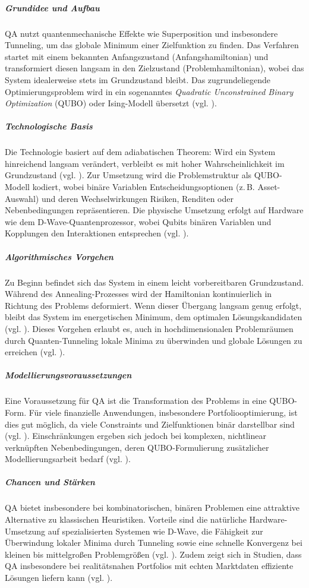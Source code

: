 \subparagraph{Grundidee und Aufbau}
QA nutzt quantenmechanische Effekte wie Superposition und insbesondere Tunneling, um das globale Minimum einer Zielfunktion zu finden. Das Verfahren startet mit einem bekannten Anfangszustand (Anfangshamiltonian) und transformiert diesen langsam in den Zielzustand (Problemhamiltonian), wobei das System idealerweise stets im Grundzustand bleibt. Das zugrundeliegende Optimierungsproblem wird in ein sogenanntes \emph{Quadratic Unconstrained Binary Optimization} (QUBO) oder Ising-Modell übersetzt (vgl. \cite{orus_quantum_2019, mugel_dynamic_2022}).

\subparagraph{Technologische Basis}
Die Technologie basiert auf dem adiabatischen Theorem: Wird ein System hinreichend langsam verändert, verbleibt es mit hoher Wahrscheinlichkeit im Grundzustand (vgl. \cite{orus_quantum_2019}). Zur Umsetzung wird die Problemstruktur als QUBO-Modell kodiert, wobei binäre Variablen Entscheidungsoptionen (z.\,B. Asset-Auswahl) und deren Wechselwirkungen Risiken, Renditen oder Nebenbedingungen repräsentieren. Die physische Umsetzung erfolgt auf Hardware wie dem D-Wave-Quantenprozessor, wobei Qubits binären Variablen und Kopplungen den Interaktionen entsprechen (vgl. \cite{mugel_dynamic_2022}).

\subparagraph{Algorithmisches Vorgehen}
Zu Beginn befindet sich das System in einem leicht vorbereitbaren Grundzustand. Während des Annealing-Prozesses wird der Hamiltonian kontinuierlich in Richtung des Problems deformiert. Wenn dieser Übergang langsam genug erfolgt, bleibt das System im energetischen Minimum, dem optimalen Lösungskandidaten (vgl. \cite{orus_quantum_2019}). Dieses Vorgehen erlaubt es, auch in hochdimensionalen Problemräumen durch Quanten-Tunneling lokale Minima zu überwinden und globale Lösungen zu erreichen (vgl. \cite{mugel_dynamic_2022, rosenberg_finding_2016}).

\subparagraph{Modellierungsvoraussetzungen}
Eine Voraussetzung für QA ist die Transformation des Problems in eine QUBO-Form. Für viele finanzielle Anwendungen, insbesondere Portfoliooptimierung, ist dies gut möglich, da viele Constraints und Zielfunktionen binär darstellbar sind (vgl. \cite{mugel_dynamic_2022}). Einschränkungen ergeben sich jedoch bei komplexen, nichtlinear verknüpften Nebenbedingungen, deren QUBO-Formulierung zusätzlicher Modellierungsarbeit bedarf (vgl. \cite{sakuler_real-world_2025}).

\subparagraph{Chancen und Stärken}
QA bietet insbesondere bei kombinatorischen, binären Problemen eine attraktive Alternative zu klassischen Heuristiken. Vorteile sind die natürliche Hardware-Umsetzung auf spezialisierten Systemen wie D-Wave, die Fähigkeit zur Überwindung lokaler Minima durch Tunneling sowie eine schnelle Konvergenz bei kleinen bis mittelgroßen Problemgrößen (vgl. \cite{mugel_dynamic_2022, sakuler_real-world_2025}). Zudem zeigt sich in Studien, dass QA insbesondere bei realitätsnahen Portfolios mit echten Marktdaten effiziente Lösungen liefern kann (vgl. \cite{mugel_dynamic_2022}).

